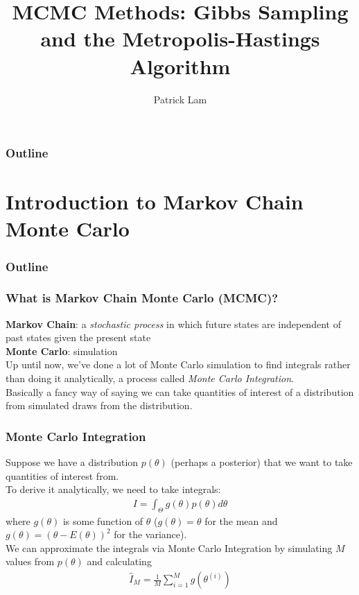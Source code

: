 \documentclass[handout]{beamer}
\author{Patrick Lam}
\title{MCMC Methods: Gibbs Sampling and the Metropolis-Hastings Algorithm}
\date{}
\begin{document}
\newcommand{\red}{\textcolor{red}}
\newcommand{\blue}{\textcolor{blue}}
\newcommand{\purple}{\textcolor{purple}}

\frame{\titlepage}

\begin{frame}
\frametitle{Outline}
\tableofcontents
\end{frame}

\section{Introduction to Markov Chain Monte Carlo}

\begin{frame}
\frametitle{Outline}
\tableofcontents[currentsection]
\end{frame}

\begin{frame}
\frametitle{What is Markov Chain Monte Carlo (MCMC)?}
\pause
\textbf{Markov Chain}: a \textit{stochastic process} in which future states are
independent of past states given the present state\\
\bigskip
\pause
\textbf{Monte Carlo}: simulation\\
\bigskip
\pause
Up until now, we've done a lot of Monte Carlo simulation to find
integrals rather than doing it analytically, a process called \textit{Monte
Carlo Integration}.\\
\bigskip
\pause 
Basically a fancy way of saying we can take
quantities of interest of a distribution from simulated draws from the
distribution.
\end{frame}

\begin{frame}
\frametitle{Monte Carlo Integration}
\pause
Suppose we have a distribution $p(\theta)$ (perhaps a posterior) that
we want to take quantities of interest from.\\
\bigskip
\pause
To derive it analytically, we need to take integrals:
\begin{eqnarray*}
I = \int_{\Theta} g(\theta) p(\theta) d\theta
\end{eqnarray*}
where $g(\theta)$ is some function of $\theta$ ($g(\theta) =
\theta$ for the mean and $g(\theta) = (\theta - E(\theta))^2$ for the
variance).\\
\bigskip
\pause
We can approximate the integrals via Monte Carlo Integration by simulating
$M$ values from $p(\theta)$ and calculating
\begin{eqnarray*}
\hat{I}_M = \frac{1}{M} \sum_{i=1}^M g(\theta^{(i)})
\end{eqnarray*}
\end{frame}
\end{document}
